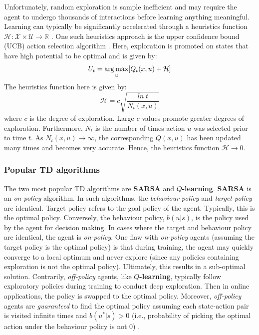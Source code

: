 Unfortunately, random exploration is sample inefficient and may require the agent to undergo thousands of interactions before learning anything meaningful. Learning can typically be significantly accelerated through a heuristics function $\mathcal{H}: \mathcal{X} \times \mathcal{U} \rightarrow \mathbb{R}$ \cite{harl}.  One such heuristics approach is the upper confidence bound (UCB) action selection algorithm \cite{ucb}. Here, exploration is promoted on states that have high potential to be optimal and is given by:
\begin{equation}
    U_t = \operatorname*{arg\,max}_u [Q_t(x, u) + \mathcal{H}] 
    \label{ucb}
\end{equation}
The heuristics function here is given by:
\begin{equation}
    \mathcal{H} = c \sqrt{\frac{ln \; t}{N_t(x, u)}}
\end{equation}
where $c$ is the degree of exploration.  Large $c$ values promote greater degrees of exploration. Furthermore, $N_t$ is the number of times action $u$ was selected prior to time $t$. As $N_t(x, u) \rightarrow \infty$, the corresponding $Q(x, u)$ has been updated many times and becomes very accurate.  Hence, the heuristics function $\mathcal{H} \rightarrow 0$. 

\subsubsection{Popular TD algorithms}
The two most popular TD algorithms are \textbf{SARSA} and \textbf{$Q$-learning}.  \textbf{SARSA} is an \textit{on-policy} algorithm. In such algorithms, the \textit{behaviour policy} and \textit{target policy} are identical.  Target policy refers to the goal policy of the agent.  Typically, this is the optimal policy.  Conversely, the behaviour policy, $b(u|s)$, is the policy used by the agent for decision making. In cases where the target and behaviour policy are identical, the agent is \textit{on-policy}. One flaw with \textit{on-policy} agents (assuming the target policy is the optimal policy) is that during training, the agent may quickly converge to a local optimum and never explore (since any policies containing exploration is not the optimal policy).  Ultimately, this results in a sub-optimal solution.  Contrarily, \textit{off-policy} agents, like \textbf{$Q$-learning}, typically follow exploratory policies during training to conduct deep exploration.  Then in online applications, the policy is swapped to the optimal policy. Moreover, \textit{off-policy} agents are \textit{guaranteed} to find the optimal policy assuming each state-action pair is visited infinite times and $b(u^* | s) > 0$ (i.e., probability of picking the optimal action under the behaviour policy is not 0) \cite{td}.

